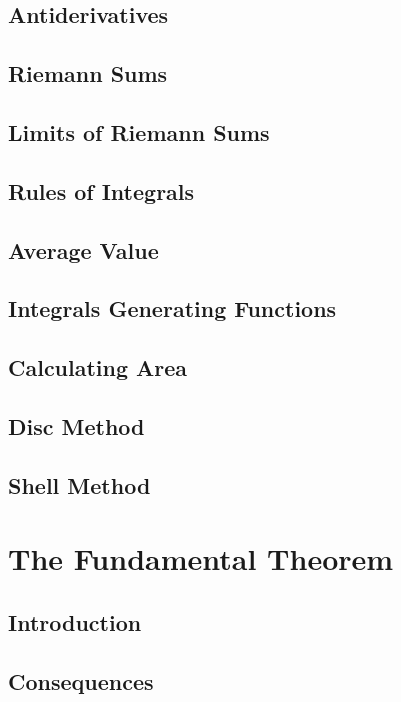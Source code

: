 \documentclass{article}
\begin{document}
\subsection{Antiderivatives}
\subsection{Riemann Sums}
\subsection{Limits of Riemann Sums}
\subsection{Rules of Integrals}
\subsection{Average Value}
\subsection{Integrals Generating Functions}
\subsection{Calculating Area}
\subsection{Disc Method}
\subsection{Shell Method}
\newpage
\section{The Fundamental Theorem}
\subsection{Introduction}
\subsection{Consequences}
\newpage
\end{document}

